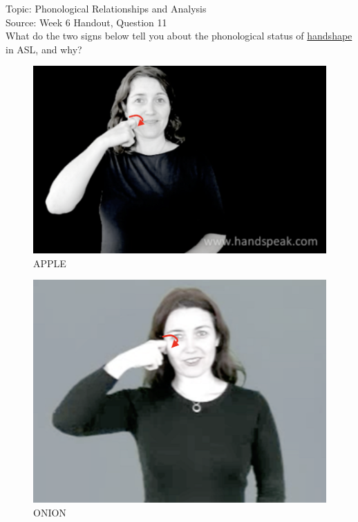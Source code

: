 \documentclass[12pt]{article}
\begin{document}
Topic: Phonological Relationships and Analysis\\
Source: Week 6 Handout, Question 11\\

What do the two signs below tell you about the phonological status of \underline{handshape} in ASL, and why?\\

\begin{figure}[H]
\includegraphics{../images/asl_apple.png}
\caption{APPLE}
\end{figure}
\begin{figure}[H]
\includegraphics{../images/asl_onion.png}
\caption{ONION}
\end{figure}

\newpage

\begin{center}
\textbf{{\color{red}{\HUGE END OF EXAM}}}\\

\end{center}
\newpage
\end{document}

